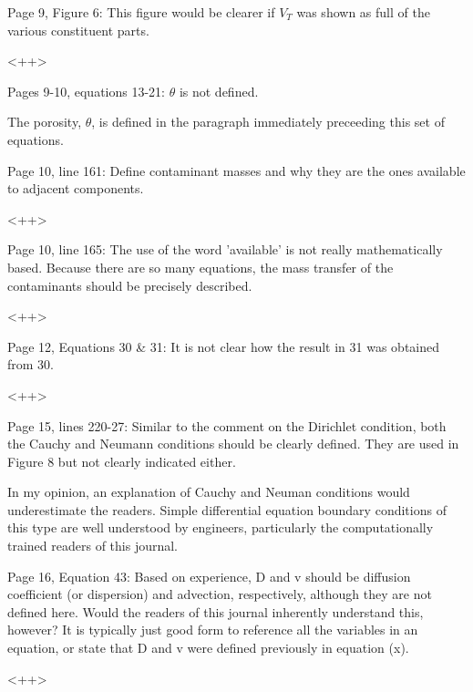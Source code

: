 \documentclass[answers,12pt]{exam}
\begin{document}
\begin{questions}
\question Page 9, Figure 6: This figure would be clearer if $V_T$ was shown as full of the various constituent parts. 
\begin{solution}
<++>
\end{solution} 
 
\question Pages 9-10, equations 13-21: $\theta$  is not defined.  
\begin{solution}
The porosity, $\theta$, is defined in the paragraph immediately preceeding this 
        set of equations.
\end{solution} 
 
\question Page  10,  line  161:  Define  contaminant  masses  and  why  they  are  the  ones  available  to  adjacent  components. 
\begin{solution}
<++>
\end{solution} 
 
\question Page  10,  line  165:  The  use  of the word 'available' is not really mathematically based. Because there are so 
many equations, the mass transfer of the contaminants should be precisely described.  
\begin{solution}
<++>
\end{solution} 
 
\question Page 12, Equations 30 \& 31: It is not clear how the result in 31 was obtained from 30.  
\begin{solution}
<++>
\end{solution} 
 
\question Page 15, lines 220-27: Similar to the comment on the Dirichlet condition, both the Cauchy and Neumann 
conditions should be clearly defined. They are used in Figure 8 but not clearly indicated either.  
\begin{solution}
In my opinion, an explanation of Cauchy and Neuman conditions would 
        underestimate the readers. Simple differential equation boundary 
        conditions of this type are well understood by engineers, 
        particularly the computationally trained readers of this journal.
\end{solution}
 
\question Page  16,  Equation  43:  Based  on  experience,  D  and  v  should  be  diffusion coefficient (or dispersion) and 
advection,  respectively,  although  they  are  not  defined  here.  Would  the  readers  of  this  journal inherently 
understand  this,  however?  It  is  typically  just  good  form  to  reference  all  the  variables  in  an  equation,  or 
state that D and v were defined previously in equation (x).  
\begin{solution}
        <++>
\end{solution} 
 

\end{questions}
\end{document}
